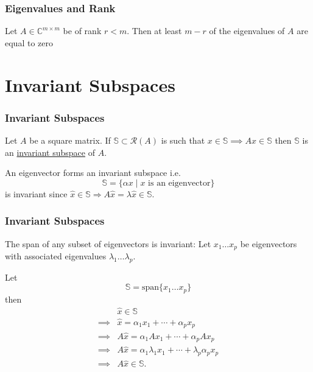 \documentclass{beamer}
\begin{document}
\begin{frame}\frametitle{Eigenvalues and Rank}
	
	\begin{lemma}
		Let $A \in \mathbb{C}^{m\times m}$ be of rank $r < m$.  Then at least $m- r$ of the eigenvalues of $A$ are equal to zero	
	\end{lemma}
\end{frame}





\section{Invariant Subspaces}
\frame{\sectionpage}

\begin{frame}\frametitle{Invariant Subspaces}
	\begin{definition}
		Let $A$ be a square matrix.  
		If $\mathbb{S} \subset \mathcal{R}(A)$ is such that $x \in \mathbb{S} \implies Ax \in \mathbb{S}$ then $\mathbb{S}$ is an \underline{invariant subspace} of $A$.
	\end{definition}
	
	\begin{example}
		An eigenvector forms an invariant subspace i.e. 
		\[
			\mathbb{S} = \{\alpha x \mid x \text{~is an eigenvector}\}
		\]
		is invariant since $\hat{x} \in \mathbb{S} \Rightarrow A\hat{x} = \lambda\hat{x} \in \mathbb{S}$.		
		\end{example}
\end{frame}

\begin{frame}\frametitle{Invariant Subspaces}
	\begin{example}
		The span of any subset of eigenvectors is invariant:  Let $x_1 \ldots x_p$ be eigenvectors with associated eigenvalues $\lambda_1 \ldots \lambda_p$.
		
		Let 
		\[
			\mathbb{S} = \text{span}\{x_1 \ldots x_p\}
		\]
		then
		\begin{align*}
			& \hat{x} \in \mathbb{S} \\
			\implies & \hat{x} = \alpha_1 x_1 + \cdots + \alpha_p x_p \\
			\implies & A\hat{x} = \alpha_1Ax_1 + \cdots + \alpha_pAx_p \\
			\implies & A\hat{x} = \alpha_1\lambda_1x_1 + \cdots + \lambda_p\alpha_px_p \\
			\implies & A\hat{x} \in \mathbb{S}.		
		\end{align*}
	\end{example}
\end{frame}
\end{document}

